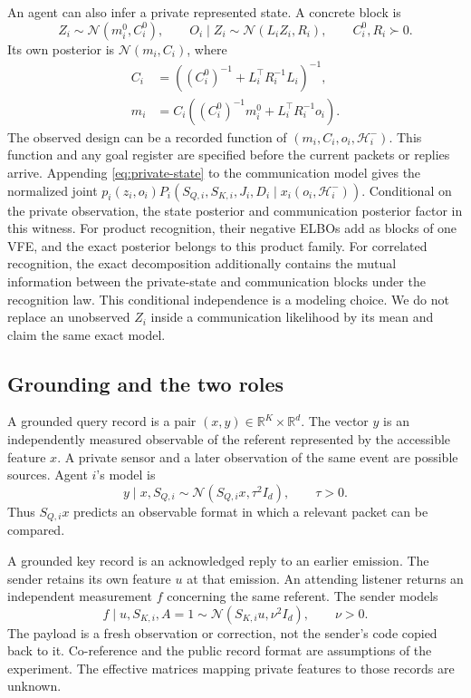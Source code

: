 \documentclass[11pt]{article}
\theoremstyle{definition}
\theoremstyle{remark}
\newcommand{\R}{\mathbb R}
\newcommand{\N}{\mathcal N}
\newcommand{\calH}{\mathcal H}
\begin{document}
An agent can also infer a private represented state. A concrete block is
\begin{equation}
Z_i\sim\N(m_i^0,C_i^0),\qquad
O_i\mid Z_i\sim\N(L_iZ_i,R_i),\qquad C_i^0,R_i\succ0.
\label{eq:private-state}
\end{equation}
Its own posterior is \(\N(m_i,C_i)\), where
\begin{align}
C_i&=\left((C_i^0)^{-1}+L_i^\top R_i^{-1}L_i\right)^{-1},\nonumber\\
m_i&=C_i\left((C_i^0)^{-1}m_i^0+L_i^\top R_i^{-1}o_i\right).
\label{eq:private-posterior}
\end{align}
The observed design can be a recorded function of \((m_i,C_i,o_i,\calH_i^-)\). This function and any goal register are specified before the current packets or replies arrive. Appending \eqref{eq:private-state} to the communication model gives the normalized joint \(p_i(z_i,o_i)P_i(S_{Q,i},S_{K,i},J_i,D_i\mid x_i(o_i,\calH_i^-))\). Conditional on the private observation, the state posterior and communication posterior factor in this witness. For product recognition, their negative ELBOs add as blocks of one VFE, and the exact posterior belongs to this product family. For correlated recognition, the exact decomposition additionally contains the mutual information between the private-state and communication blocks under the recognition law. This conditional independence is a modeling choice. We do not replace an unobserved \(Z_i\) inside a communication likelihood by its mean and claim the same exact model.

\subsection{Grounding and the two roles}

A grounded query record is a pair \((x,y)\in\R^K\times\R^d\). The vector \(y\) is an independently measured observable of the referent represented by the accessible feature \(x\). A private sensor and a later observation of the same event are possible sources. Agent \(i\)'s model is
\begin{equation}
y\mid x,S_{Q,i}\sim\N(S_{Q,i} x,\tau^2I_d),\qquad \tau>0.
\label{eq:ground-q}
\end{equation}
Thus \(S_{Q,i} x\) predicts an observable format in which a relevant packet can be compared.

A grounded key record is an acknowledged reply to an earlier emission. The sender retains its own feature \(u\) at that emission. An attending listener returns an independent measurement \(f\) concerning the same referent. The sender models
\begin{equation}
f\mid u,S_{K,i},A=1\sim\N(S_{K,i} u,\nu^2I_d),\qquad \nu>0.
\label{eq:ground-k}
\end{equation}
The payload is a fresh observation or correction, not the sender's code copied back to it. Co-reference and the public record format are assumptions of the experiment. The effective matrices mapping private features to those records are unknown.
\end{document}
